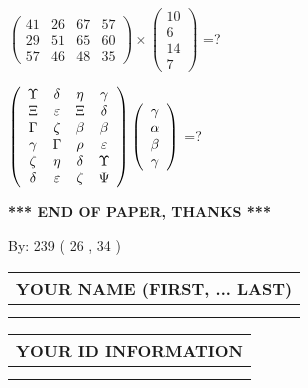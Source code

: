 \documentclass[12pt]{article}
\begin{document}
  
 
$ \left( \begin{array}{ccccccccc}
 41  & 
 26  & 
 67  & 
 57  \\ 
 29  & 
 51  & 
 65  & 
 60  \\ 
 57  & 
 46  & 
 48  & 
 35
\end{array}\right) \times
\left( \begin{array}{c}
 10  \\ 
 6  \\ 
 14  \\ 
 7
\end{array}\right) $ =?
 
 
$  %
 \left( \begin{array}
 {
 c
 c
 c
 c
 }
 \Upsilon & 
 \delta & 
 \eta & 
 \gamma \\ 
                    \Xi & 
 \varepsilon & 
                    \Xi & 
 \delta \\ 
 \Gamma & 
                    \zeta & 
 \beta & 
 \beta \\ 
 \gamma & 
 \Gamma & 
 \rho & 
 \varepsilon \\ 
                    \zeta & 
 \eta & 
 \delta & 
 \Upsilon \\ 
 \delta & 
 \varepsilon & 
                    \zeta & 
 \Psi
 \end{array} \right)
 \left( \begin{array}
 {
 c
 }
 \gamma \\ 
 \alpha \\ 
 \beta \\ 
 \gamma
 \end{array} \right)
$ =?
 

 

 
\vspace{0.3in}
   
   
 \vspace{0.2in}
 
   
   
   
   
\vspace{1.0in} 
{\textbf{\large{ *** END OF PAPER, THANKS *** }}} 
   
   
\hspace{1.0in} By: 
 239 ( 26 ,  34 )
   
   
   
   
\newpage 
\setcounter{page}{ 
    33001 } 
   
   
   
   
\noindent\begin{tabular}{|l|}
\hline
YOUR NAME (FIRST, ... LAST)  \\
\hline
 \\ 
 \\ 
\hline
\end{tabular}
\hspace{0.05in} \begin{tabular}{|l|}
\hline
 YOUR   ID   INFORMATION  \\
\hline
 \\ 
 \\ 
\hline
\end{tabular}
   
\end{document}
